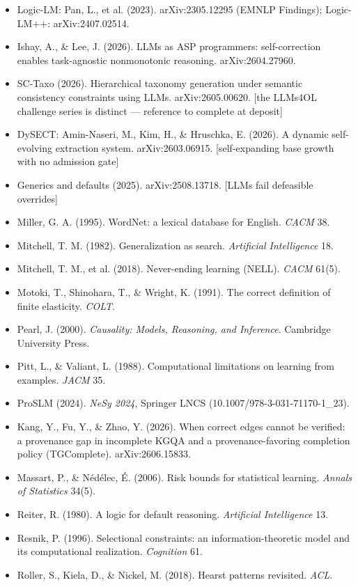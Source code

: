 \documentclass[11pt]{article}
\begin{document}
\begin{itemize}
\item Logic-LM: Pan, L., et al. (2023). arXiv:2305.12295 (EMNLP Findings); Logic-LM++: arXiv:2407.02514.
\item Ishay, A., \& Lee, J. (2026). LLMs as ASP programmers: self-correction enables task-agnostic nonmonotonic reasoning. arXiv:2604.27960.
\item SC-Taxo (2026). Hierarchical taxonomy generation under semantic consistency constraints using LLMs. arXiv:2605.00620. [the LLMs4OL challenge series is distinct — reference to complete at deposit]
\item DySECT: Amin-Naseri, M., Kim, H., \& Hruschka, E. (2026). A dynamic self-evolving extraction system. arXiv:2603.06915. [self-expanding base growth with no admission gate]
\item Generics and defaults (2025). arXiv:2508.13718. [LLMs fail defeasible overrides]
\item Miller, G. A. (1995). WordNet: a lexical database for English. \emph{CACM} 38.
\item Mitchell, T. M. (1982). Generalization as search. \emph{Artificial Intelligence} 18.
\item Mitchell, T. M., et al. (2018). Never-ending learning (NELL). \emph{CACM} 61(5).
\item Motoki, T., Shinohara, T., \& Wright, K. (1991). The correct definition of finite elasticity. \emph{COLT}.
\item Pearl, J. (2000). \emph{Causality: Models, Reasoning, and Inference}. Cambridge University Press.
\item Pitt, L., \& Valiant, L. (1988). Computational limitations on learning from examples. \emph{JACM} 35.
\item ProSLM (2024). \emph{NeSy 2024}, Springer LNCS (10.1007/978-3-031-71170-1\_23).
\item Kang, Y., Fu, Y., \& Zhao, Y. (2026). When correct edges cannot be verified: a provenance gap in incomplete KGQA and a provenance-favoring completion policy (TGComplete). arXiv:2606.15833.
\item Massart, P., \& Nédélec, É. (2006). Risk bounds for statistical learning. \emph{Annals of Statistics} 34(5).
\item Reiter, R. (1980). A logic for default reasoning. \emph{Artificial Intelligence} 13.
\item Resnik, P. (1996). Selectional constraints: an information-theoretic model and its computational realization. \emph{Cognition} 61.
\item Roller, S., Kiela, D., \& Nickel, M. (2018). Hearst patterns revisited. \emph{ACL}.

\end{itemize}
\end{document}
